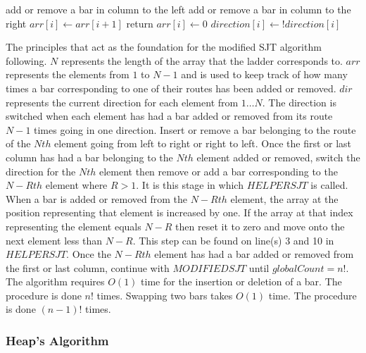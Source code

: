 \begin{algorithm}
  \begin{algorithmic}[1]
            \State add or remove a bar in column to the left 
          \Else
            \State add or remove a bar in column to the right
          \EndIf
          \State $arr[i]\gets arr[i+1]$
          \State return
        \Else 
          \State $arr[i] \gets 0$
          \State $direction[i] \gets !direction[i]$
        \EndIf
      \EndFor
      \EndFunction
  \end{algorithmic}
\end{algorithm}

The principles that act as the foundation for the modified SJT algorithm following. $N$ represents the length of the array that the ladder 
corresponds to. $arr$ represents the elements from $1$ to $N-1$ and is 
used to keep track of how many times a bar corresponding to one of their routes 
has been added or removed. $dir$ represents the current direction for 
each element from $1 \dots N$. The direction is switched when each element has had a 
bar added or removed from its route $N-1$ times going in one direction. 
Insert or remove a bar belonging to the route of the $Nth$ element going 
from left to right or right to left. Once the first or last column has had a bar 
belonging to the $Nth$ element added or removed, switch the direction for the $Nth$
element then remove or add a bar corresponding to the 
$N-Rth$ element where $R>1$. It is this stage in which $HELPERSJT$ is called. When a bar 
is added or removed from the $N-Rth$ element, the array at the position representing 
that element is increased by one. If the array at that index representing the element 
equals $N-R$ then reset it to zero and move onto the next element less than $N-R$. This step can be found 
on line(s) 3 and 10 in $HELPERSJT$. Once the $N-Rth$ element has had a bar added or removed from the first or last column, 
continue with $MODIFIEDSJT$ until $globalCount=n!$. The algorithm requires $O(1)$ time for the insertion or 
deletion of a bar. The procedure is done $n!$ times. Swapping two bars takes $O(1)$ time. The procedure is done 
$(n-1)!$ times.\pagebreak



\subsubsection{Heap's Algorithm}

